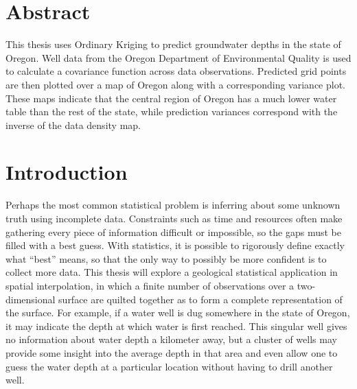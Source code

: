 \documentclass[12pt,twoside]{reedthesis}
\begin{document}
    \chapter*{Abstract}
    
    This thesis uses Ordinary Kriging to predict groundwater depths in the state of Oregon. Well data from the Oregon Department of Environmental Quality is used to calculate a covariance function across data observations. Predicted grid points are then plotted over a map of Oregon along with a corresponding variance plot. These maps indicate that the central region of Oregon has a much lower water table than the rest of the state, while prediction variances correspond with the inverse of the data density map.    
    
	

  \mainmatter %
  \pagestyle{fancyplain} %


    \chapter*{Introduction}
	
Perhaps the most common statistical problem is inferring about some unknown truth using incomplete data. Constraints such as time and resources often make gathering every piece of information difficult or impossible, so the gaps must be filled with a best guess. With statistics, it is possible to rigorously define exactly what ``best'' means, so that the only way to possibly be more confident is to collect more data. This thesis will explore a geological statistical application in spatial interpolation, in which a finite number of observations over a two-dimensional surface are quilted together as to form a complete representation of the surface. For example, if a water well is dug somewhere in the state of Oregon, it may indicate the depth at which water is first reached. This singular well gives no information about water depth a kilometer away, but a cluster of wells may provide some insight into the average depth in that area and even allow one to guess the water depth at a particular location without having to drill another well. 
\end{document}
